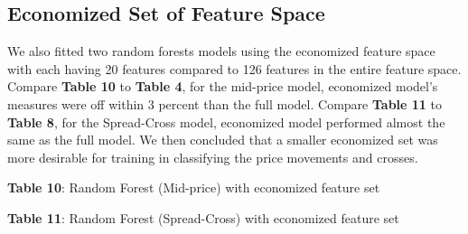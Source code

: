 \documentclass[11pt]{article}
\begin{document}
\subsection{Economized Set of Feature Space}
We also fitted two random forests models using the economized feature space with each having 20 features compared to 126 features in the entire feature space. Compare \textbf{Table 10} to \textbf{Table 4}, for the mid-price model, economized model's measures were off within 3 percent than the full model. Compare \textbf{Table 11} to \textbf{Table 8}, for the Spread-Cross model, economized model performed almost the same as the full model. We then concluded that a smaller economized set was more desirable for training in classifying the price movements and crosses.
\begin{multicols}{2}
\begin{center}
\renewcommand{\arraystretch}{1.4}
\small \textbf{Table 10}: Random Forest (Mid-price) with economized feature set
\end{center}

\begin{center}
\renewcommand{\arraystretch}{1.4}
\small \textbf{Table 11}: Random Forest (Spread-Cross) with economized feature set
\end{center}
\end{multicols}
\end{document}
